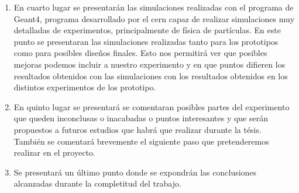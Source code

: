 \begin{enumerate}
\item{} En cuarto lugar se presentarán las simulaciones realizadas con el programa de Geant4, programa desarrollado por el cern capaz de realizar simulaciones muy detalladas de experimentos, principalmente de física de partículas. En este punto se presentaran las simulaciones realizadas tanto para los prototipos como para posibles diseños finales. Esto nos permitirá ver que posibles mejoras podemos incluir a nuestro experimento y en que puntos difieren los resultados obtenidos con las simulaciones con los resultados obtenidos en los distintos experimentos de los prototipo.

\item{} En quinto lugar se presentará se comentaran posibles partes del experimento que queden inconclusas o inacabadas o puntos interesantes y que serán propuestos a futuros estudios que habrá que realizar durante la tésis. También se comentará brevemente el siguiente paso que pretenderemos realizar en el proyecto.

\item{} Se presentará un último punto donde se expondrán las conclusiones alcanzadas durante la completitud del trabajo.

\end{enumerate}